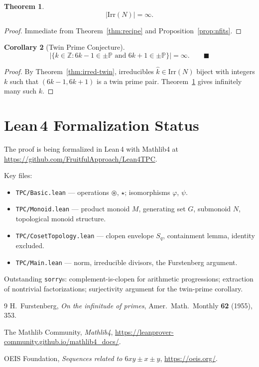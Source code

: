 \documentclass[12pt,a4paper]{amsart}
\theoremstyle{plain}
\newtheorem{theorem}{Theorem}[section]
\newtheorem{corollary}[theorem]{Corollary}
\theoremstyle{definition}
\theoremstyle{remark}
\newcommand{\circstar}{\mathbin{\circledast}}
\newcommand{\bstar}{\mathbin{\star}}
\newcommand{\Irr}{\mathrm{Irr}}
\newcommand{\qhat}[1]{\widehat{#1}}
\newcommand{\bbZ}{\mathbb{Z}}
\newcommand{\bbP}{\mathbb{P}}
\begin{document}
\begin{theorem}
\label{thm:main}
$$|\Irr(N)| = \infty.$$
\end{theorem}
\begin{proof}
Immediate from Theorem~\ref{thm:recipe} and Proposition~\ref{prop:nfits}.
\end{proof}

\begin{corollary}[Twin Prime Conjecture]
\label{cor:tpc}
$$\bigl|\{k \in \bbZ : 6k-1 \in \pm\bbP \text{ and } 6k+1 \in \pm\bbP\}\bigr|
= \infty. \qquad \blacksquare$$
\end{corollary}
\begin{proof}
By Theorem~\ref{thm:irred-twin}, irreducibles $\qhat{k} \in \Irr(N)$ biject
with integers $k$ such that $(6k-1, 6k+1)$ is a twin prime pair.
Theorem~\ref{thm:main} gives infinitely many such $k$.
\end{proof}

\section*{Lean\,4 Formalization Status}

The proof is being formalized in Lean\,4 with Mathlib4 at
\url{https://github.com/FruitfulApproach/Lean4TPC}.

Key files:
\begin{itemize}[nosep]
  \item \texttt{TPC/Basic.lean} --- operations $\circstar$, $\bstar$; isomorphisms $\varphi$, $\psi$.
  \item \texttt{TPC/Monoid.lean} --- product monoid $M$, generating set $G$, submonoid $N$, topological monoid structure.
  \item \texttt{TPC/CosetTopology.lean} --- clopen envelope $S_q$, containment lemma, identity excluded.
  \item \texttt{TPC/Main.lean} --- norm, irreducible divisors, the Furstenberg argument.
\end{itemize}

Outstanding \texttt{sorry}s: complement-is-clopen for arithmetic progressions;
extraction of nontrivial factorizations; surjectivity argument for the
twin-prime corollary.

\begin{thebibliography}{9}
  H.~Furstenberg,
  \textit{On the infinitude of primes},
  Amer.\ Math.\ Monthly \textbf{62} (1955), 353.

  The Mathlib Community,
  \textit{Mathlib4},
  \url{https://leanprover-community.github.io/mathlib4_docs/}.

  OEIS Foundation,
  \textit{Sequences related to $6xy \pm x \pm y$},
  \url{https://oeis.org/}.
\end{thebibliography}
\end{document}
